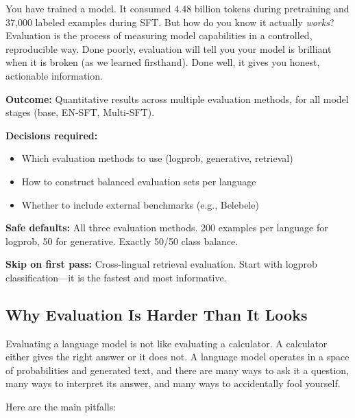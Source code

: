 \documentclass[11pt,a4paper]{article}
\begin{document}
You have trained a model. It consumed 4.48 billion tokens during pretraining and 37,000 labeled examples during SFT. But how do you know it actually \emph{works}? Evaluation is the process of measuring model capabilities in a controlled, reproducible way. Done poorly, evaluation will tell you your model is brilliant when it is broken (as we learned firsthand). Done well, it gives you honest, actionable information.

\begin{buildnow}
\textbf{Outcome:} Quantitative results across multiple evaluation methods, for all model stages (base, EN-SFT, Multi-SFT).

\textbf{Decisions required:}
\begin{itemize}[nosep]
  \item Which evaluation methods to use (logprob, generative, retrieval)
  \item How to construct balanced evaluation sets per language
  \item Whether to include external benchmarks (e.g., Belebele)
\end{itemize}

\textbf{Safe defaults:} All three evaluation methods. 200 examples per language for logprob, 50 for generative. Exactly 50/50 class balance.

\textbf{Skip on first pass:} Cross-lingual retrieval evaluation. Start with logprob classification---it is the fastest and most informative.
\end{buildnow}

\subsection{Why Evaluation Is Harder Than It Looks}

Evaluating a language model is not like evaluating a calculator. A calculator either gives the right answer or it does not. A language model operates in a space of probabilities and generated text, and there are many ways to ask it a question, many ways to interpret its answer, and many ways to accidentally fool yourself.

Here are the main pitfalls:
\end{document}
